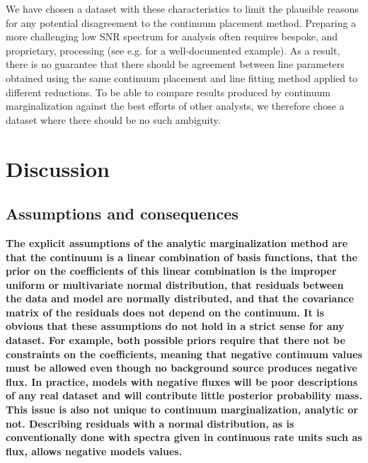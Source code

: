 \documentclass[trackchanges]{aastex62}
\begin{document}
{We have chosen a dataset with these characteristics to limit the plausible reasons for any potential disagreement to the continuum placement method.
Preparing a more challenging low SNR spectrum for analysis often requires bespoke, and proprietary, processing (see e.g. \citealt{Wakker:2015} for a well-documented example).
As a result, there is no guarantee that there should be agreement between line parameters obtained using the same continuum placement and line fitting method applied to different reductions.
To be able to compare results produced by continuum marginalization against the best efforts of other analysts, we therefore chose a dataset where there should be no such ambiguity.
}


\section{Discussion}
\label{sec:discussion}
\subsection{Assumptions and consequences}
{\bf
The explicit assumptions of the analytic marginalization method are that the continuum is a linear combination of basis functions, that the prior on the coefficients of this linear combination is the improper uniform or multivariate normal distribution, that residuals between the data and model are normally distributed, and that the covariance matrix of the residuals does not depend on the continuum.
It is obvious that these assumptions do not hold in a strict sense for any dataset.
For example, both possible priors require that there not be constraints on the coefficients, meaning that negative continuum values must be allowed even though no background source produces negative flux.
In practice, models with negative fluxes will be poor descriptions of any real dataset and will contribute little posterior probability mass.
This issue is also not unique to continuum marginalization, analytic or not.
Describing residuals with a normal distribution, as is conventionally done with spectra given in continuous rate units such as flux, allows negative models values.
}
\end{document}
